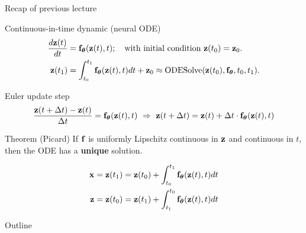\begin{frame}{Recap of previous lecture}
	\begin{block}{Continuous-in-time dynamic (neural ODE)}
		\vspace{-0.7cm}
		\begin{align*}
		   \frac{d \mathbf{z}(t)}{dt} &= \mathbf{f}_{\boldsymbol{\theta}}(\mathbf{z}(t), t); \quad \text{with initial condition }\mathbf{z}(t_0) = \mathbf{z}_0. \\
		   \mathbf{z}(t_1) &= \int^{t_1}_{t_0} \mathbf{f}_{\boldsymbol{\theta}}(\mathbf{z}(t), t) d t  + \mathbf{z}_0 \approx \text{ODESolve}(\mathbf{z}(t_0), \mathbf{f}_{\boldsymbol{\theta}}, t_0,t_1).
		\end{align*}
		\vspace{-0.7cm}
	\end{block}	
	\begin{block}{Euler update step}
		\vspace{-0.6cm}
		\[
   \frac{\mathbf{z}(t + \Delta t) - \mathbf{z}(t)}{\Delta t} = \mathbf{f}_{\boldsymbol{\theta}}(\mathbf{z}(t), t) \,\, \Rightarrow \,\, \mathbf{z}(t + \Delta t) = \mathbf{z}(t) + \Delta t \cdot \mathbf{f}_{\boldsymbol{\theta}}(\mathbf{z}(t), t)
		\]
		\vspace{-0.7cm}
	\end{block}	
	\begin{block}{Theorem (Picard)}
		If $\mathbf{f}$ is uniformly Lipschitz continuous in $\mathbf{z}$ and continuous in $t$, then the ODE has a \textbf{unique} solution.
	\end{block}
		\vspace{-0.7cm}
		\begin{align*}
			\mathbf{x} &= \mathbf{z}(t_1) = \mathbf{z}(t_0) + \int_{t_0}^{t_1} \mathbf{f}_{\boldsymbol{\theta}}(\mathbf{z}(t), t) dt \\
			\mathbf{z} &= \mathbf{z}(t_0) = \mathbf{z}(t_1) + \int_{t_1}^{t_0} \mathbf{f}_{\boldsymbol{\theta}}(\mathbf{z}(t), t) dt
		\end{align*}
\end{frame}
\begin{frame}{Outline}
	\tableofcontents
\end{frame}
